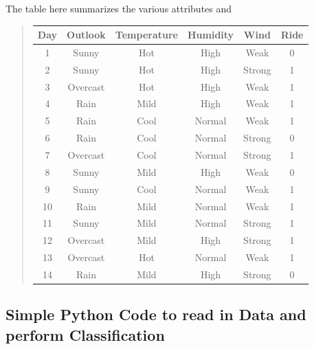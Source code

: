 \documentclass[%
oneside,                 %
final,                   %
10pt]{article}
\begin{document}
The table here summarizes the various attributes and

\begin{quote}
\begin{tabular}{cccccc}
\hline
\multicolumn{1}{c}{ Day } & \multicolumn{1}{c}{ Outlook } & \multicolumn{1}{c}{ Temperature } & \multicolumn{1}{c}{ Humidity } & \multicolumn{1}{c}{ Wind } & \multicolumn{1}{c}{ Ride } \\
\hline
1   & Sunny    & Hot         & High     & Weak   & 0    \\
2   & Sunny    & Hot         & High     & Strong & 1    \\
3   & Overcast & Hot         & High     & Weak   & 1    \\
4   & Rain     & Mild        & High     & Weak   & 1    \\
5   & Rain     & Cool        & Normal   & Weak   & 1    \\
6   & Rain     & Cool        & Normal   & Strong & 0    \\
7   & Overcast & Cool        & Normal   & Strong & 1    \\
8   & Sunny    & Mild        & High     & Weak   & 0    \\
9   & Sunny    & Cool        & Normal   & Weak   & 1    \\
10  & Rain     & Mild        & Normal   & Weak   & 1    \\
11  & Sunny    & Mild        & Normal   & Strong & 1    \\
12  & Overcast & Mild        & High     & Strong & 1    \\
13  & Overcast & Hot         & Normal   & Weak   & 1    \\
14  & Rain     & Mild        & High     & Strong & 0    \\
\hline
\end{tabular}
\end{quote}

\noindent

\subsection*{Simple Python Code to read in Data and perform Classification}
\end{document}
